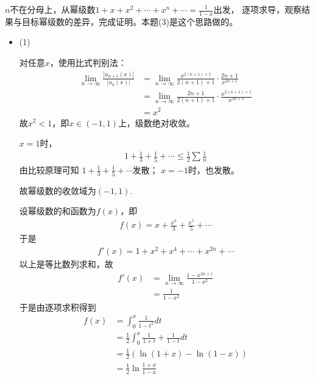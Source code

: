 \documentclass{article}
\begin{document}
$n$不在分母上，从幂级数$1 + x + x^2 + \cdots + x^n + \cdots = \frac{1}{1 - x}$出发，
逐项求导，观察结果与目标幂级数的差异，完成证明。本题(3)是这个思路做的。
\begin{itemize}
  \item (1)

        对任意$x$，使用比式判别法：
        \begin{align*}
          \lim\limits_{n \to \infty} \frac{|u_{n + 1}(x)|}{|u_n(x)|}
           & = \lim\limits_{n \to \infty} \frac{x^{2(n+1) + 1}}{2(n+1) + 1} \cdot \frac{2n + 1}{x^{2n + 1}} \\
           & = \lim\limits_{n \to \infty} \frac{2n + 1}{2(n+1) + 1} \cdot \frac{x^{2(n+1) + 1}}{x^{2n + 1}} \\
           & = x^2
        \end{align*}
        故$x^2 < 1$，即$x \in (-1, 1)$上，级数绝对收敛。

        $x = 1$时，
        \begin{align*}
          1 + \frac{1}{3} + \frac{1}{5} + \cdots
          \leq \frac{1}{2} \sum \frac{1}{n}
        \end{align*}
        由比较原理可知
        $1 + \frac{1}{3} + \frac{1}{5} + \cdots$发散；
        $x = -1$时，也发散。

        故幂级数的收敛域为$(-1, 1)$.

        设幂级数的和函数为$f(x)$，即
        \begin{align*}
          f(x) = x + \frac{x^3}{3} + \frac{x^5}{5} + \cdots
        \end{align*}
        于是
        \begin{align*}
          f'(x) = 1 + x^2 + x^4 + \cdots + x^{2n} + \cdots
        \end{align*}
        以上是等比数列求和，故
        \begin{align*}
          f'(x) & = \lim\limits_{n \to \infty} \frac{1 - x^{2n + 1}}{1 - x^2} \\
                & = \frac{1}{1 - x^2}
        \end{align*}
        于是由逐项求积得到
        \begin{align*}
          f(x) & = \int_{0}^{x} \frac{1}{1 - t^2} dt                            \\
               & = \frac{1}{2}\int_{0}^{x} \frac{1}{1 + t} + \frac{1}{1 - t} dt \\
               & = \frac{1}{2} (\ln (1 + x) - \ln (1 - x))                      \\
               & = \frac{1}{2} \ln \frac{1 + x}{1 - x}
        \end{align*}


\end{itemize}
\end{document}
